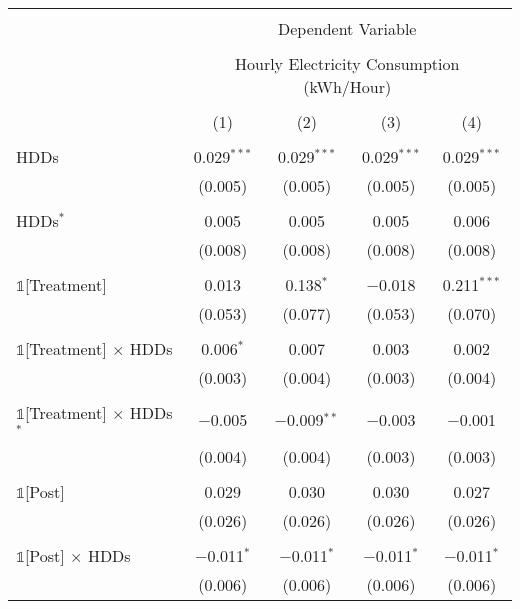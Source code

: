 
\begin{table}[!htbp] \centering 
  \label{Table:Breakdown-of-Average-Treatement-Effects_By-Tariff_15-to-18} 
\scriptsize
\begin{tabular}{@{\extracolsep{30pt}}lcccc} 
\\[-1.8ex]\hline 
\hline \\[-1.8ex] 
 & \multicolumn{4}{c}{Dependent Variable} \\ 
\cline{2-5} 
\\[-1.8ex] & \multicolumn{4}{c}{Hourly Electricity Consumption  (kWh/Hour)} \\ 
\\[-1.8ex] & (1) & (2) & (3) & (4)\\ 
\hline \\[-1.8ex] 
 HDDs & 0.029$^{***}$ & 0.029$^{***}$ & 0.029$^{***}$ & 0.029$^{***}$ \\ 
  & (0.005) & (0.005) & (0.005) & (0.005) \\ 
  & & & & \\ 
 HDDs$^{*}$ & 0.005 & 0.005 & 0.005 & 0.006 \\ 
  & (0.008) & (0.008) & (0.008) & (0.008) \\ 
  & & & & \\ 
 $\mathbb{1}$[Treatment] & 0.013 & 0.138$^{*}$ & $-$0.018 & 0.211$^{***}$ \\ 
  & (0.053) & (0.077) & (0.053) & (0.070) \\ 
  & & & & \\ 
 $\mathbb{1}$[Treatment] $\times$ HDDs & 0.006$^{*}$ & 0.007 & 0.003 & 0.002 \\ 
  & (0.003) & (0.004) & (0.003) & (0.004) \\ 
  & & & & \\ 
 $\mathbb{1}$[Treatment] $\times$ HDDs$^{*}$ & $-$0.005 & $-$0.009$^{**}$ & $-$0.003 & $-$0.001 \\ 
  & (0.004) & (0.004) & (0.003) & (0.003) \\ 
  & & & & \\ 
 $\mathbb{1}$[Post] & 0.029 & 0.030 & 0.030 & 0.027 \\ 
  & (0.026) & (0.026) & (0.026) & (0.026) \\ 
  & & & & \\ 
 $\mathbb{1}$[Post] $\times$ HDDs & $-$0.011$^{*}$ & $-$0.011$^{*}$ & $-$0.011$^{*}$ & $-$0.011$^{*}$ \\ 
  & (0.006) & (0.006) & (0.006) & (0.006) \\ 

\end{tabular}
\end{table}
